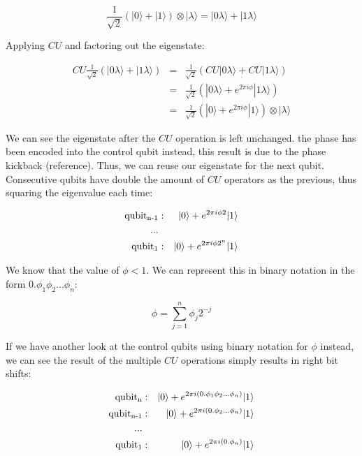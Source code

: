 \documentclass[twocolumn,showpacs,preprintnumbers,amsmath,amssymb]{revtex4}
\begin{document}
		$$ \frac{1}{\sqrt{2}}(|0\rangle + |1\rangle) \otimes |\lambda\rangle = |0 \lambda \rangle + |1 \lambda\rangle$$
		
		Applying $CU$ and factoring out the eigenstate:
		
		\begin{eqnarray*}
		 CU \frac{1}{\sqrt{2}}(|0 \lambda \rangle + |1 \lambda\rangle) &=&  \frac{1}{\sqrt{2}}(CU|0 \lambda \rangle + CU|1 \lambda\rangle )\\
		 &=& \frac{1}{\sqrt{2}}(|0 \lambda \rangle + e^{2\pi i \phi}|1 \lambda\rangle)\\
		 &=&\frac{1}{\sqrt{2}}( |0 \rangle + e^{2\pi i \phi}|1 \rangle)\otimes |\lambda\rangle
		\end{eqnarray*}
		
		We can see the eigenstate after the $CU$ operation is left unchanged. the phase has been encoded into the control qubit instead, this result is due to the phase kickback (reference). Thus, we can reuse our eigenstate for the next qubit. Consecutive qubits have double the amount of $CU$ operators as the previous, thus squaring the eigenvalue each time:
		
		\begin{eqnarray*}
		\text{qubit\textsubscript{n-1}} &:&   |0 \rangle + e^{2\pi i \phi 2}|1 \rangle \\
		...\\
		\text{qubit\textsubscript{1}} &:&   |0 \rangle + e^{2\pi i \phi 2^n}|1 \rangle
	    \end{eqnarray*}
		
		We know that the value of $\phi < 1$. We can represent this in binary notation  in the form $0.\phi_1\phi_2...\phi_n$:
		
		$$\phi = \sum_{j=1}^n \phi_j 2^{-j}$$
		
		If we have another look at the control qubits using binary notation for $\phi$ instead, we can see the result of the multiple $CU$ operations simply results in right bit shifts:
		
		
		\begin{eqnarray*}
			\text{qubit\textsubscript{n}} &:&   |0 \rangle +e^{2\pi i (0.\phi_1\phi_2...\phi_n)}|1 \rangle  \\
			\text{qubit\textsubscript{n-1}} &:&   |0 \rangle + e^{2\pi i (0.\phi_2...\phi_n)}|1 \rangle \\
			...\\
			\text{qubit\textsubscript{1}} &:&   |0 \rangle + e^{2\pi i (0.\phi_n)}|1 \rangle
		\end{eqnarray*}
	
\end{document}
